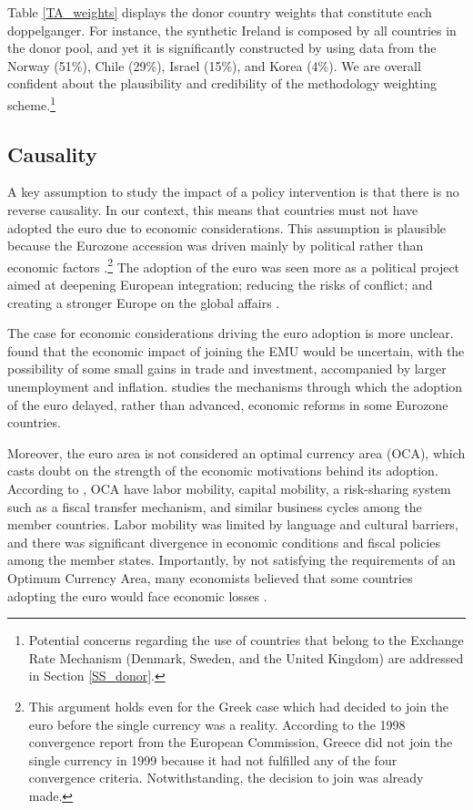\documentclass[12pt]{article}
\begin{document}
Table \ref{TA_weights} displays the donor country weights that constitute each doppelganger. For instance, the synthetic Ireland is composed by all countries in the donor pool, and yet it is significantly constructed by using data from the Norway (51\%), Chile (29\%), Israel (15\%), and Korea (4\%). We are overall confident about the plausibility and credibility of the methodology weighting scheme.\footnote{Potential concerns regarding the use of countries that belong to the Exchange Rate Mechanism (Denmark, Sweden, and the United Kingdom) are addressed in Section \ref{SS_donor}.}

\subsection{Causality \label{SS_Causality}}

A key assumption to study the impact of a policy intervention is that there is no reverse causality. In our context, this means that countries must not have adopted the euro due to economic considerations. This assumption is plausible because the Eurozone accession was driven mainly by political rather than economic factors \citep{Feldstein1997, Dyson1999, Willett2000, Spolaore2013}.\footnote{This argument holds even for the Greek case which had decided to join the euro before the single currency was a reality. According to the 1998 convergence report from the European Commission, Greece did not join the single currency in 1999 because it had not fulfilled any of the four convergence criteria. Notwithstanding, the decision to join was already made.} The adoption of the euro was seen more as a political project aimed at deepening European integration; reducing the risks of conflict; and creating a stronger Europe on the global affairs \citep{Eichengreen1993, James2012}. 

The case for economic considerations driving the euro adoption is more unclear. \cite{Feldstein1997} found that the economic impact of joining the EMU would be uncertain, with the possibility of some small gains in trade and investment, accompanied by larger unemployment and inflation. \cite{Fernandez2013} studies the mechanisms through which the adoption of the euro delayed, rather than advanced, economic reforms in some Eurozone countries.

Moreover, the euro area is not considered an optimal currency area (OCA), which casts doubt on the strength of the economic motivations behind its adoption. According to \citep{Mundell1961}, OCA have labor mobility, capital mobility, a risk-sharing system such as a fiscal transfer mechanism, and similar business cycles among the member countries. Labor mobility was limited by language and cultural barriers, and there was significant divergence in economic conditions and fiscal policies among the member states. Importantly, by not satisfying the requirements of an Optimum Currency Area, many economists believed that some countries adopting the euro would face economic losses \citep{Jonung2009}.
\end{document}
